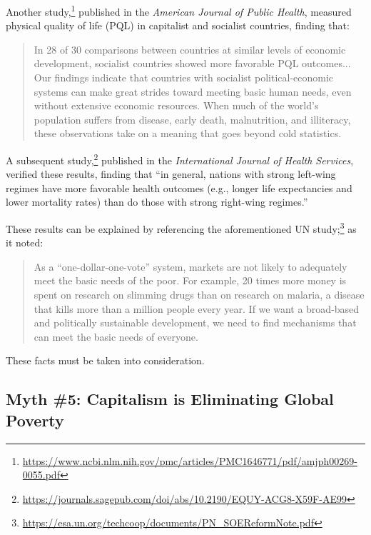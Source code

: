 Another study,\footnote{\href{https://www.ncbi.nlm.nih.gov/pmc/articles/PMC1646771/pdf/amjph00269-0055.pdf}{https://www.ncbi.nlm.nih.gov/pmc/articles/PMC1646771/pdf/amjph00269-0055.pdf}} published in the \textit{American Journal of Public Health}, measured physical quality of life (PQL) in capitalist and socialist countries, finding that:

\begin{quote}
In 28 of 30 comparisons between countries at similar levels of economic development, socialist countries showed more favorable PQL outcomes...
Our findings indicate that countries with socialist political-economic systems can make great strides toward meeting basic human needs, even without extensive economic resources.
When much of the world's population suffers from disease, early death, malnutrition, and illiteracy, these observations take on a meaning that goes beyond cold statistics.
\end{quote}

A subsequent study,\footnote{\href{https://journals.sagepub.com/doi/abs/10.2190/EQUY-ACG8-X59F-AE99}{https://journals.sagepub.com/doi/abs/10.2190/EQUY-ACG8-X59F-AE99}} published in the \textit{International Journal of Health Services}, verified these results, finding that ``in general, nations with strong left-wing regimes have more favorable health outcomes (e.g., longer life expectancies and lower mortality rates) than do those with strong right-wing regimes.''

These results can be explained by referencing the aforementioned UN study;\footnote{\href{https://esa.un.org/techcoop/documents/PN_SOEReformNote.pdf}{https://esa.un.org/techcoop/documents/PN\_SOEReformNote.pdf}} as it noted:

\begin{quote}
As a ``one-dollar-one-vote'' system, markets are not likely to adequately meet the basic needs of the poor.
For example, 20 times more money is spent on research on slimming drugs than on research on malaria, a disease that kills more than a million people every year.
If we want a broad-based and politically sustainable development, we need to find mechanisms that can meet the basic needs of everyone.
\end{quote}

These facts must be taken into consideration.

\subsection*{Myth \#5: Capitalism is Eliminating Global Poverty}

